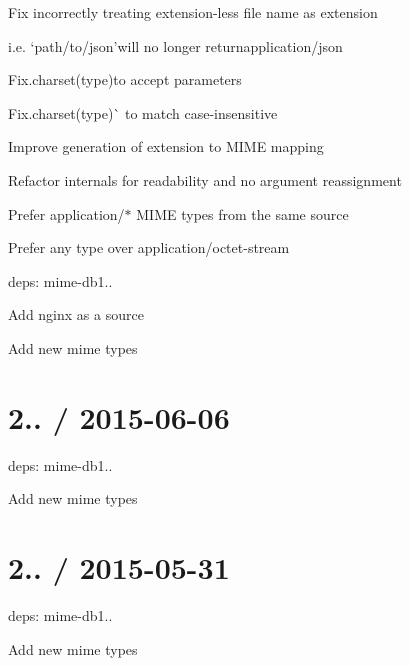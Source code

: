 \begin{DoxyItemize}
\item Fix incorrectly treating extension-\/less file name as extension
\begin{DoxyItemize}
\item i.\+e. `\textquotesingle{}path/to/json'{\ttfamily will no longer return}application/json{\ttfamily }
\end{DoxyItemize}
\item {\ttfamily Fix}.charset(type){\ttfamily to accept parameters}
\item {\ttfamily Fix}.charset(type)\`{} to match case-\/insensitive
\item Improve generation of extension to M\+I\+ME mapping
\item Refactor internals for readability and no argument reassignment
\item Prefer {\ttfamily application/$\ast$} M\+I\+ME types from the same source
\item Prefer any type over {\ttfamily application/octet-\/stream}
\item deps\+: mime-\/db1..
\begin{DoxyItemize}
\item Add nginx as a source
\item Add new mime types
\end{DoxyItemize}
\end{DoxyItemize}

\section*{2.. / 2015-\/06-\/06 }


\begin{DoxyItemize}
\item deps\+: mime-\/db1..
\begin{DoxyItemize}
\item Add new mime types
\end{DoxyItemize}
\end{DoxyItemize}

\section*{2.. / 2015-\/05-\/31 }


\begin{DoxyItemize}
\item deps\+: mime-\/db1..
\begin{DoxyItemize}
\item Add new mime types
\end{DoxyItemize}
\end{DoxyItemize}

